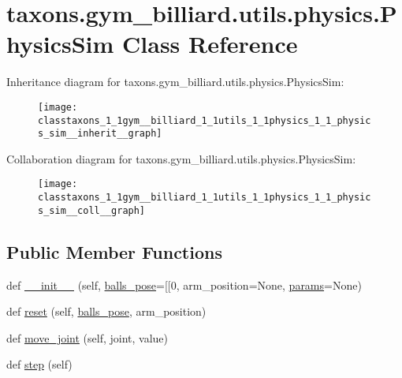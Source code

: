 \hypertarget{classtaxons_1_1gym__billiard_1_1utils_1_1physics_1_1_physics_sim}{}\section{taxons.\+gym\+\_\+billiard.\+utils.\+physics.\+Physics\+Sim Class Reference}
\label{classtaxons_1_1gym__billiard_1_1utils_1_1physics_1_1_physics_sim}


Inheritance diagram for taxons.\+gym\+\_\+billiard.\+utils.\+physics.\+Physics\+Sim\+:
\nopagebreak
\begin{figure}[H]
\begin{center}
\leavevmode
\texttt{[image: classtaxons\_1\_1gym\_\_billiard\_1\_1utils\_1\_1physics\_1\_1\_physics\_sim\_\_inherit\_\_graph]}
\end{center}
\end{figure}


Collaboration diagram for taxons.\+gym\+\_\+billiard.\+utils.\+physics.\+Physics\+Sim\+:
\nopagebreak
\begin{figure}[H]
\begin{center}
\leavevmode
\texttt{[image: classtaxons\_1\_1gym\_\_billiard\_1\_1utils\_1\_1physics\_1\_1\_physics\_sim\_\_coll\_\_graph]}
\end{center}
\end{figure}
\subsection*{Public Member Functions}
\begin{DoxyCompactItemize}
\item 
def \hyperlink{classtaxons_1_1gym__billiard_1_1utils_1_1physics_1_1_physics_sim_ab842c6319e9f955cfd01edb08254767e}{\+\_\+\+\_\+init\+\_\+\+\_\+} (self, \hyperlink{namespacetaxons_1_1gym__billiard_1_1utils_1_1physics_a8bc2a92fdcd41a3ac33d11920f5871ef}{balls\+\_\+pose}=\mbox{[}\mbox{[}0, arm\+\_\+position=None, \hyperlink{classtaxons_1_1gym__billiard_1_1utils_1_1physics_1_1_physics_sim_a792836f28bac1455384063c3f064fdf7}{params}=None)
\item 
def \hyperlink{classtaxons_1_1gym__billiard_1_1utils_1_1physics_1_1_physics_sim_a0b6e45f6371b9518910074680445eddb}{reset} (self, \hyperlink{namespacetaxons_1_1gym__billiard_1_1utils_1_1physics_a8bc2a92fdcd41a3ac33d11920f5871ef}{balls\+\_\+pose}, arm\+\_\+position)
\item 
def \hyperlink{classtaxons_1_1gym__billiard_1_1utils_1_1physics_1_1_physics_sim_a4b875d6d8ed0a57c352a818e018caf9b}{move\+\_\+joint} (self, joint, value)
\item 
def \hyperlink{classtaxons_1_1gym__billiard_1_1utils_1_1physics_1_1_physics_sim_acda5146d1453d700020341295a220d5f}{step} (self)
\end{DoxyCompactItemize}
